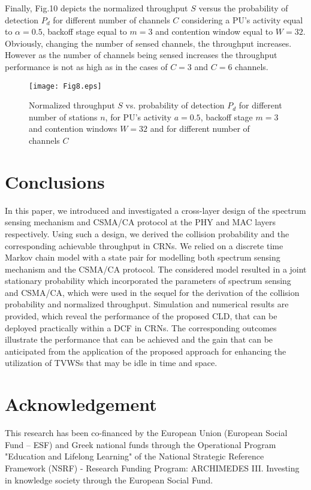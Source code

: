 \documentclass
[journal,11pt,draftclsnofoot,onecolumn,doublespace]{tETN2e}
\begin{document}
Finally, Fig.10 depicts the normalized throughput $S$ versus the probability of detection $P_d$ for different number of channels $C$ considering a PU’s activity equal to $\alpha=0.5$, backoff stage equal to $m=3$ and contention window equal to $W= 32$. Obviously, changing the number of sensed channels, the throughput increases. However as the number of channels being sensed increases the throughput performance is not as high as in the cases of $C=3$ and $C=6$ channels.
\begin{figure}
\centering
  \texttt{[image: Fig8.eps]}\\
  \caption{Normalized throughput $S$ vs. probability of detection $P_d$ for different number of stations $n$, for PU’s activity $a=0.5$, backoff stage $m=3$ and contention windows $W=32$ and for different number of channels $C$}
  \label{fig:8}
\end{figure}

\section{Conclusions}
In this paper, we introduced and investigated a cross-layer design of the spectrum sensing mechanism and CSMA/CA protocol at the PHY and MAC layers respectively. Using such a design, we derived the collision probability and the corresponding achievable throughput in CRNs. We relied on a discrete time Markov chain model with a state pair for modelling both spectrum sensing mechanism and the CSMA/CA protocol. The considered model resulted in a joint stationary probability which incorporated the parameters of spectrum sensing and CSMA/CA, which were used in the sequel for the derivation of the collision probability and normalized throughput. Simulation and numerical results are provided, which reveal the performance of the proposed CLD, that can be deployed practically within a DCF in CRNs. The corresponding outcomes illustrate the performance that can be achieved and the gain that can be anticipated from the application of the proposed approach for enhancing the utilization of TVWSs that may be idle in time and space.

\section*{Acknowledgement}
This research has been co-financed by the European Union (European Social Fund – ESF) and Greek national funds through the Operational Program "Education and Lifelong Learning" of the National Strategic Reference Framework (NSRF) - Research Funding Program: ARCHIMEDES III. Investing in knowledge society through the European Social Fund.
\end{document}
